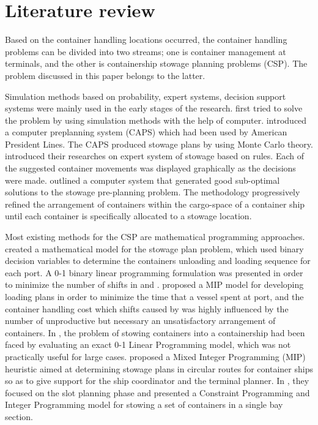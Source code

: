 \documentclass[review,3p,times,authoryear,12pt]{elsarticle}
\begin{document}
\section{Literature review}
\label{sec:lr}
Based on the container handling locations occurred, the container handling problems can be divided into two streams; one is container management at terminals, and the other is containership stowage planning problems (CSP).
The problem discussed in this paper belongs to the latter.

Simulation methods based on probability, expert systems, decision support systems were mainly used in the early stages of the research.
\cite{webster1970container} first tried to solve the problem by using simulation methods with the help of computer.
\cite{shields1984containership} introduced a computer preplanning system (CAPS) which had been used by American President Lines.
The CAPS produced stowage plans by using Monte Carlo theory.
\cite{dillingham1986application} introduced their researches on expert system of stowage based on rules.
Each of the suggested container movements was displayed graphically as the decisions were made.
\cite{wilson2001container} outlined a computer system that generated good sub-optimal solutions to the stowage pre-planning problem.
The methodology progressively refined the arrangement of containers within the cargo-space of a container ship until each container is specifically allocated to a stowage location.

Most existing methods for the CSP are mathematical programming approaches.
\cite{botter1991stowage} created a mathematical model for the stowage plan problem, which used binary decision variables to determine the containers unloading and loading sequence for each port.
A 0-1 binary linear programming formulation was presented in order to minimize the number of shifts in \cite{avriel1998stowage} and \cite{avriel2000container}.
\cite{haghani2001model} proposed a MIP model for developing loading plans in order to minimize the time that a vessel spent at port, and the container handling cost which shifts caused by was highly influenced by the number of unproductive but necessary an unsatisfactory arrangement of containers.
In \cite{ambrosino2004stowing}, the problem of stowing containers into a containership had been faced by evaluating an exact 0-1 Linear Programming model, which was not practically useful for large cases.
\cite{ambrosino2015mip} proposed a Mixed  Integer  Programming (MIP) heuristic aimed at determining stowage plans in circular routes for container ships so as to give support for the ship coordinator and the terminal planner.
In \cite{parreno2016grasp}, they focused on the slot planning phase and presented a Constraint Programming and Integer Programming model for stowing a set of containers in a single bay section.
\end{document}
